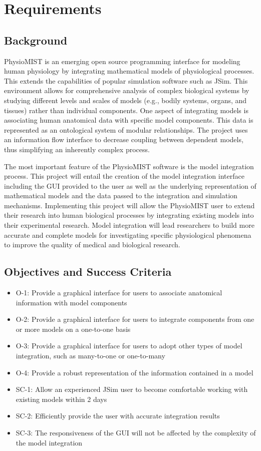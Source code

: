 \documentclass{article}
\begin{document}
\section{Requirements}
\subsection{Background}
PhysioMIST is an emerging open source programming interface for modeling human physiology by integrating mathematical models of physiological processes.
This extends the capabilities of popular simulation software such as JSim.
This environment allows for comprehensive analysis of complex biological systems by studying different levels and scales of models (e.g., bodily systems, organs, and tissues) rather than individual components.
One aspect of integrating models is associating human anatomical data with specific model components. This data is represented as an ontological system of modular relationships.
The project uses an information flow interface to decrease coupling between dependent models, thus simplifying an inherently complex process.

The most important feature of the PhysioMIST software is the model integration process.
This project will entail the creation of the model integration interface including the GUI provided to the user as well as the underlying representation of mathematical models and the data passed to the integration and simulation mechanisms.
Implementing this project will allow the PhysioMIST user to extend their research into human biological processes by integrating existing models into their experimental research.
Model integration will lead researchers to build more accurate and complete models for investigating specific physiological phenomena to improve the quality of medical and biological research.

\subsection{Objectives and Success Criteria}
\begin{itemize}
\item O-1: Provide a graphical interface for users to associate anatomical information with model components
\item O-2: Provide a graphical interface for users to integrate components from one or more models on a one-to-one basis
\item O-3: Provide a graphical interface for users to adopt other types of model integration, such as many-to-one or one-to-many
\item O-4: Provide a robust representation of the information contained in a model
\item SC-1: Allow an experienced JSim user to become comfortable working with existing models within 2 days
\item SC-2: Efficiently provide the user with accurate integration results
\item SC-3: The responsiveness of the GUI will not be affected by the complexity of the model integration
\end{itemize}
\end{document}
